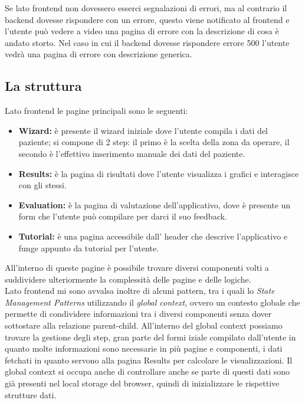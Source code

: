 \noindent Se lato frontend non dovessero esserci segnalazioni di errori, ma al contrario il backend dovesse rispondere con un errore, questo viene notificato al frontend e l'utente può vedere a video una pagina di errore con la descrizione di cosa è andato storto. Nel caso in cui il backend dovesse rispondere errore 500 l'utente vedrà una pagina di errore con descrizione generica. 

\subsection{La struttura}
Lato frontend le pagine principali sono le seguenti:\\ 
\begin{itemize}
    \item \textbf{Wizard:} è presente il wizard iniziale dove l'utente compila i dati del paziente; si compone di 2 step:  il primo è la scelta della zona da operare, il secondo è l'effettivo inserimento manuale dei dati del paziente.
    \item \textbf{Results:} è la pagina di risultati dove l'utente visualizza i grafici e interagisce con gli stessi.
    \item \textbf{Evaluation:} è la pagina di valutazione dell'applicativo, dove è presente un form che l'utente può compilare per darci il suo feedback. 
    \item \textbf{Tutorial:} è una pagina accessibile dall' header che descrive l'applicativo e funge appunto da tutorial per l'utente. 
\end{itemize}
All'interno di queste pagine è possibile trovare diversi componenti volti a suddividere ulteriormente la complessità delle pagine e delle logiche.\\ 

Lato frontend mi sono avvalsa inoltre di alcuni pattern, tra i quali lo \textit{State Management Patterns} utilizzando il \textit{global context}, ovvero un contesto globale che permette di condividere informazioni tra i diversi componenti senza dover sottostare alla relazione parent-child. All'interno del global context possiamo trovare la gestione degli step, gran parte del formi iziale compilato dall'utente in quanto molte informazioni sono necessarie in più pagine e componenti, i dati fetchati in quanto servono alla pagina Results per calcolare le visualizzazioni. Il global context si occupa anche di controllare anche se parte di questi dati sono già presenti nel local storage del browser, quindi di inizializzare le rispettive strutture dati.\\

